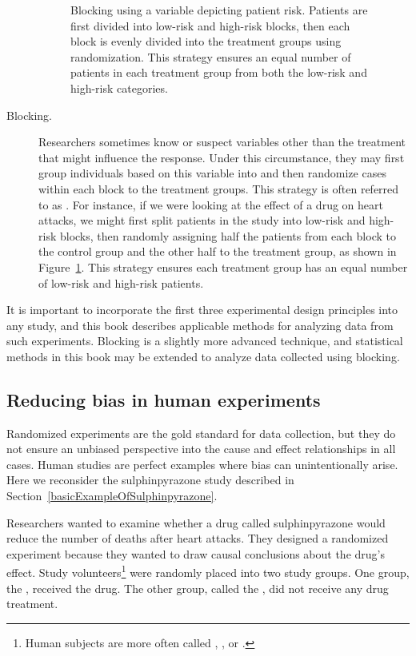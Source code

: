 \begin{description}
\begin{figure}
\caption{Blocking using a variable depicting patient risk. Patients are first divided into low-risk and high-risk blocks, then each block is evenly divided into the treatment groups using randomization. This strategy ensures an equal number of patients in each treatment group from both the low-risk and high-risk categories.}
\label{figureShowingBlocking}
\end{figure}
\item[Blocking.] Researchers sometimes know or suspect variables other than the treatment that might influence the response. Under this circumstance, they may first group individuals based on this variable into  and then randomize cases within each block to the treatment groups. This strategy is often referred to as . For instance, if we were looking at the effect of a drug on heart attacks, we might first split patients in the study into low-risk and high-risk blocks, then randomly assigning half the patients from each block to the control group and the other half to the treatment group, as shown in Figure~\ref{figureShowingBlocking}. This strategy ensures each treatment group has an equal number of low-risk and high-risk patients.
\end{description}

It is important to incorporate the first three experimental design principles into any study, and this book describes applicable methods for analyzing data from such experiments. Blocking is a slightly more advanced technique, and statistical methods in this book may be extended to analyze data collected using blocking.

\subsection{Reducing bias in human experiments}
\label{biasInHumanExperiments}

Randomized experiments are the gold standard for data collection, but they do not ensure an unbiased perspective into the cause and effect relationships in all cases. Human studies are perfect examples where bias can unintentionally arise. Here we reconsider the sulphinpyrazone study described in Section~\ref{basicExampleOfSulphinpyrazone}.

Researchers wanted to examine whether a drug called sulphinpyrazone would reduce the number of deaths after heart attacks. They designed a randomized experiment because they wanted to draw causal conclusions about the drug's effect. Study volunteers\footnote{Human subjects are more often called , , or .} were randomly placed into two study groups. One group, the , received the drug. The other group, called the , did not receive any drug treatment.


